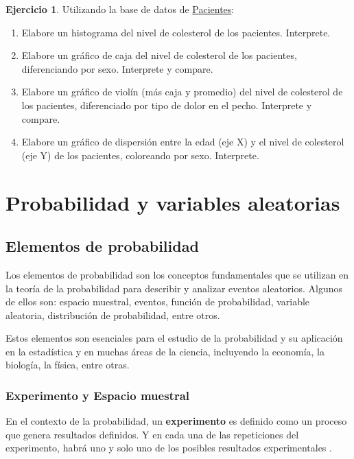 \documentclass[
  11pt,
]{book}
\providecommand{\tightlist}{%
  \setlength{\itemsep}{0pt}\setlength{\parskip}{0pt}}
\theoremstyle{definition}
\theoremstyle{definition}
\theoremstyle{definition}
\newtheorem{exercise}{Ejercicio}[chapter]
\theoremstyle{definition}
\theoremstyle{remark}
\begin{document}
\begin{exercise}

Utilizando la base de datos de \hyperref[Pacientes]{Pacientes}:

\begin{enumerate}
\def\labelenumi{\arabic{enumi}.}
\tightlist
\item
  Elabore un histograma del nivel de colesterol de los pacientes. Interprete.
\item
  Elabore un gráfico de caja del nivel de colesterol de los pacientes, diferenciando por sexo. Interprete y compare.
\item
  Elabore un gráfico de violín (más caja y promedio) del nivel de colesterol de los pacientes, diferenciado por tipo de dolor en el pecho. Interprete y compare.
\item
  Elabore un gráfico de dispersión entre la edad (eje X) y el nivel de colesterol (eje Y) de los pacientes, coloreando por sexo. Interprete.
\end{enumerate}

\end{exercise}

\chapter{Probabilidad y variables aleatorias}\label{probabilidad-variables}

\section{Elementos de probabilidad}\label{probabilidad-variables-elementos}

Los elementos de probabilidad son los conceptos fundamentales que se utilizan en la teoría de la probabilidad para describir y analizar eventos aleatorios. Algunos de ellos son: espacio muestral, eventos, función de probabilidad, variable aleatoria, distribución de probabilidad, entre otros.

Estos elementos son esenciales para el estudio de la probabilidad y su aplicación en la estadística y en muchas áreas de la ciencia, incluyendo la economía, la biología, la física, entre otras.

\subsection{Experimento y Espacio muestral}\label{probabilidad-variables-elementos-experimento}

En el contexto de la probabilidad, un \textbf{experimento} es definido como un proceso que genera resultados definidos. Y en cada una de las repeticiones del experimento, habrá uno y solo uno de los posibles resultados experimentales \citep[página 143]{anderson}.
\end{document}
